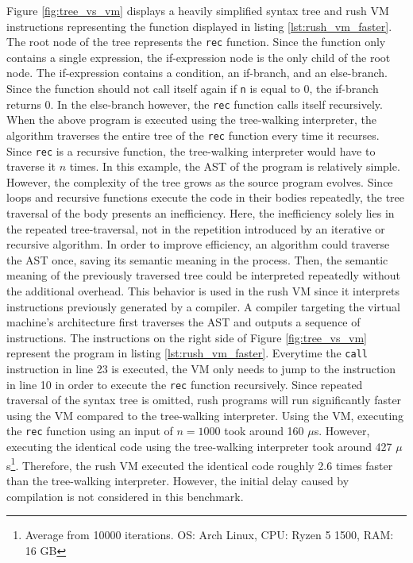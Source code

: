 Figure \ref{fig:tree_vs_vm} displays a heavily simplified syntax tree and rush VM instructions representing the function displayed in listing \ref{lst:rush_vm_faster}.
The root node of the tree represents the \texttt{rec} function.
Since the function only contains a single expression, the if-expression node is the only child of the root node.
The if-expression contains a condition, an if-branch, and an else-branch.
Since the function should not call itself again if \texttt{n} is equal to 0, the if-branch returns 0.
In the else-branch however, the \texttt{rec} function calls itself recursively.
When the above program is executed using the tree-walking interpreter, the algorithm traverses the entire tree of the \texttt{rec} function every time it recurses.
Since \texttt{rec} is a recursive function, the tree-walking interpreter would have to traverse it $n$ times.
In this example, the AST of the program is relatively simple.
However, the complexity of the tree grows as the source program evolves.
Since loops and recursive functions execute the code in their bodies repeatedly, the tree traversal of the body presents an inefficiency.
Here, the inefficiency solely lies in the repeated tree-traversal, not in the repetition introduced by an iterative or recursive algorithm.
In order to improve efficiency, an algorithm could traverse the AST once, saving its semantic meaning in the process.
Then, the semantic meaning of the previously traversed tree could be interpreted repeatedly without the additional overhead.
This behavior is used in the rush VM since it interprets instructions previously generated by a compiler.
A compiler targeting the virtual machine's architecture first traverses the AST and outputs a sequence of instructions.
The instructions on the right side of Figure \ref{fig:tree_vs_vm} represent the program in listing \ref{lst:rush_vm_faster}.
Everytime the \texttt{call} instruction in line 23 is executed, the VM only needs to jump to the instruction in line 10 in order to execute the \texttt{rec} function recursively.
Since repeated traversal of the syntax tree is omitted, rush programs will run significantly faster using the VM compared to the tree-walking interpreter.
Using the VM, executing the \texttt{rec} function using an input of $n = 1000$ took around 160 $\mu$s.
However, executing the identical code using the tree-walking interpreter took around 427 $\mu$s\footnote{Average from 10000 iterations. OS: Arch Linux, CPU: Ryzen 5 1500, RAM: 16 GB}.
Therefore, the rush VM executed the identical code roughly 2.6 times faster than the tree-walking interpreter.
However, the initial delay caused by compilation is not considered in this benchmark.

